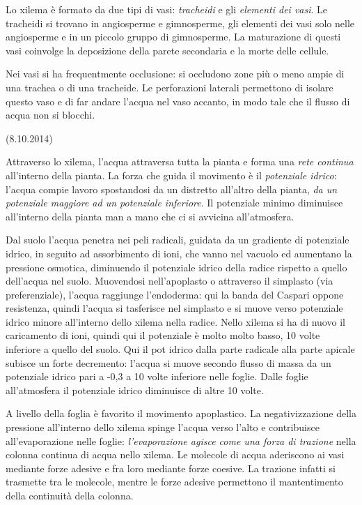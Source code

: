 \documentclass[a4paper,12pt]{book}
\begin{document}
Lo xilema è formato da due tipi di vasi: \emph{tracheidi} e gli \emph{elementi dei vasi}. Le tracheidi si trovano in angiosperme e gimnosperme, gli elementi dei vasi solo nelle angiosperme e in un piccolo gruppo di gimnosperme. La maturazione di questi vasi coinvolge la deposizione della parete secondaria e la morte delle cellule.
 
Nei vasi si ha frequentmente occlusione: si occludono zone più o meno ampie di una trachea o di una tracheide. Le perforazioni laterali permettono di isolare questo vaso e di far andare l'acqua nel vaso accanto, in modo tale che il flusso di acqua non si blocchi.

(8.10.2014)


Attraverso lo xilema, l'acqua attraversa tutta la pianta e forma una \emph{rete continua} all'interno della pianta. La forza che guida il movimento è il \emph{potenziale idrico}: l'acqua compie lavoro spostandosi da un distretto all'altro della pianta, \emph{da un potenziale maggiore ad un potenziale inferiore}. Il potenziale minimo diminuisce all'interno della pianta man a mano che ci si avvicina all'atmosfera.

Dal suolo l'acqua penetra nei peli radicali, guidata da un gradiente di potenziale idrico, in seguito ad assorbimento di ioni, che vanno nel vacuolo ed aumentano la pressione osmotica, diminuendo il potenziale idrico della radice rispetto a quello dell'acqua nel suolo. Muovendosi nell'apoplasto o attraverso il simplasto (via preferenziale), l'acqua raggiunge l'endoderma: qui la banda del Caspari oppone resistenza, quindi l'acqua si tasferisce nel simplasto e si muove verso potenziale idrico minore all'interno dello xilema nella radice. Nello xilema si ha di nuovo il caricamento di ioni, quindi qui il potenziale è molto molto basso, 10 volte inferiore a quello del suolo. Qui il pot idrico dalla parte radicale alla parte apicale subisce un forte decremento: l'acqua si muove secondo flusso di massa da un potenziale idrico pari a -0,3 a 10 volte inferiore nelle foglie. Dalle foglie all'atmosfera il potenziale idrico diminuisce di altre 10 volte.

A livello della foglia è favorito il movimento apoplastico.
La negativizzazione della pressione all'interno dello xilema spinge l'acqua verso l'alto e contribuisce all'evaporazione nelle foglie: \emph{l'evaporazione agisce come una forza di trazione} nella colonna continua di acqua nello xilema. Le molecole di acqua aderiscono ai vasi mediante forze adesive e fra loro mediante forze coesive. La trazione infatti si trasmette tra le molecole, mentre le forze adesive permettono il mantentimento della continuità della colonna.
\end{document}

